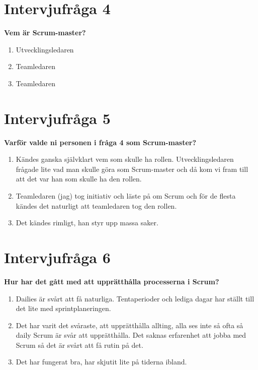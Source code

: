 \section{Intervjufråga 4}
\textbf{Vem är Scrum-master?}
\begin{enumerate}
\item Utvecklingsledaren
\item Teamledaren
\item Teamledaren
\end{enumerate}

\section{Intervjufråga 5}
\textbf{Varför valde ni personen i fråga 4 som Scrum-master?}
\begin{enumerate}
\item Kändes ganska självklart vem som skulle ha rollen. Utvecklingsledaren frågade lite vad man skulle göra som Scrum-master och då kom vi fram till att det var han som skulle ha den rollen.
\item Teamledaren (jag) tog initiativ och läste på om Scrum och för de flesta kändes det naturligt att teamledaren tog den rollen. 
\item Det kändes rimligt, han styr upp massa saker.
\end{enumerate}

\section{Intervjufråga 6}
\textbf{Hur har det gått med att upprätthålla processerna i Scrum?}
\begin{enumerate}
\item Dailies är svårt att få naturliga. Tentaperioder och lediga dagar har ställt till det lite med sprintplaneringen.
\item Det har varit det svåraste, att upprätthålla allting, alla ses inte så ofta så daily Scrum är svår att upprätthålla. Det saknas erfarenhet att jobba med Scrum så det är svårt att få rutin på det.
\item Det har fungerat bra, har skjutit lite på tiderna ibland.
\end{enumerate}

